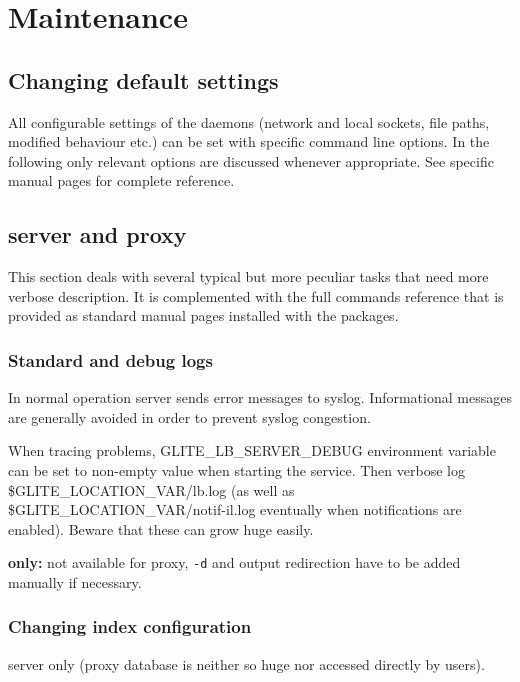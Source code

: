 \section{Maintenance}

\subsection{Changing default settings}
All configurable settings of the \LB daemons (network and local sockets, 
file paths, modified behaviour etc.) can be set with specific command line
options.
In the following only relevant options are discussed whenever appropriate.
See specific manual pages for complete reference.

\subsection{\LB server and proxy}

This section deals with several typical but more peculiar tasks
that need more verbose description.
It is complemented with the full commands reference that is provided
as standard manual pages installed with the \LB packages.

\subsubsection{Standard and debug logs}

In normal operation \LB server sends error messages to syslog.
Informational messages are generally avoided in order to prevent syslog congestion.

\begin{sloppypar}
When tracing problems, GLITE\_LB\_SERVER\_DEBUG environment variable can be set to
non-empty value when starting the service.
Then verbose log \$GLITE\_LOCATION\_VAR/lb.log 
(as well as \$GLITE\_LOCATION\_VAR/notif-il.log eventually when notifications are enabled).
Beware that these can grow huge easily.
\end{sloppypar}

\textbf{\LBold only:} not available for \LB proxy, \verb'-d' and output redirection
have to be added manually if necessary.

\subsubsection{Changing index configuration}

\LB server only (\LB proxy database is neither so huge nor accessed directly by users).

